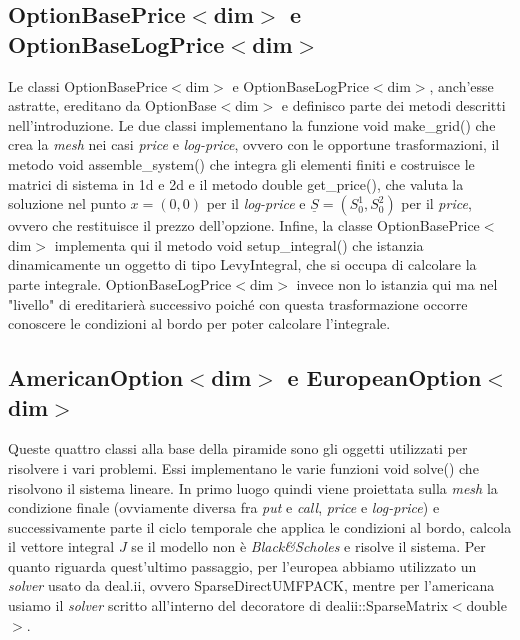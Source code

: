 \documentclass[a4paper,10pt]{report}
\theoremstyle{plain}
\theoremstyle{definition}
\theoremstyle{remark}
\begin{document}
\subsection{\textsf{OptionBasePrice$<$dim$>$} e \textsf{OptionBaseLogPrice$<$dim$>$}}
Le classi \textsf{OptionBasePrice$<$dim$>$} e \textsf{OptionBaseLogPrice$<$dim$>$}, anch'esse astratte, ereditano da \textsf{OptionBase$<$dim$>$} e definisco parte dei metodi descritti nell'introduzione. Le due classi implementano la funzione \textsf{void make\_grid()} che crea la \emph{mesh} nei casi \emph{price} e \emph{log-price}, ovvero con le opportune trasformazioni, il metodo \textsf{void assemble\_system()} che integra gli elementi finiti e costruisce le matrici di sistema in 1d e 2d e il metodo \textsf{double get\_price()}, che valuta la soluzione nel punto $x=(0,0)$ per il \emph{log-price} e $\underline{S}=(S_0^1, S_0^2)$ per il \emph{price}, ovvero che restituisce il prezzo dell'opzione. Infine, la classe \textsf{OptionBasePrice$<$dim$>$} implementa qui il metodo \textsf{void setup\_integral()} che istanzia dinamicamente un oggetto di tipo \textsf{LevyIntegral}, che si occupa di calcolare la parte integrale. \textsf{OptionBaseLogPrice$<$dim$>$} invece non lo istanzia qui ma nel "livello" di ereditarier\`a successivo poich\'e con questa trasformazione occorre conoscere le condizioni al bordo per poter calcolare l'integrale.
\subsection{\textsf{AmericanOption$<$dim$>$} e \textsf{EuropeanOption$<$dim$>$}}
Queste quattro classi alla base della piramide sono gli oggetti utilizzati per risolvere i vari problemi. Essi implementano le varie funzioni \textsf{void solve()} che risolvono il sistema lineare. In primo luogo quindi viene proiettata sulla \emph{mesh} la condizione finale (ovviamente diversa fra \emph{put} e \emph{call}, \emph{price} e \emph{log-price}) e successivamente parte il ciclo temporale che applica le condizioni al bordo, calcola il vettore integral $J$ se il modello non \`e \emph{Black\&Scholes} e risolve il sistema. Per quanto riguarda quest'ultimo passaggio, per l'europea abbiamo utilizzato un \emph{solver} usato da \textsf{deal.ii}, ovvero \textsf{SparseDirectUMFPACK}, mentre per l'americana usiamo il \emph{solver} scritto all'interno del decoratore di \textsf{dealii::SparseMatrix$<$double$>$}.

\end{document}
